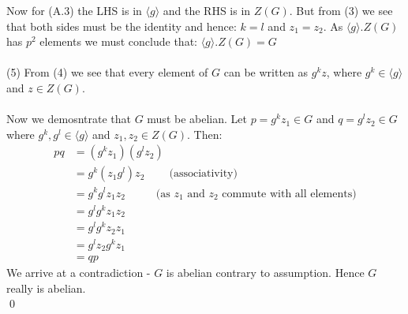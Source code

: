 \documentclass[12pt,a4paper]{article}
\begin{document}
Now for (A.3) the LHS is in $\langle g \rangle$ and the RHS is in $Z(G)$.  But from (3) we see that both sides must be the identity and hence:
$k=l$ and $z_1=z_2$.  As $\langle g \rangle . Z(G)$ has $p^2$ elements we must conclude that: $\langle g \rangle . Z(G) = G$ \\
\\
(5) From (4) we see that every element of $G$ can be written as $g^k z$, where $g^k \in \langle g \rangle$ and $z \in Z(G)$.\\
\\
Now we demosntrate that $G$ must be abelian.  Let $p = g^k z_1 \in G$ and $q = g^l z_2 \in G$ where $g^k, g^l \in \langle g \rangle$ and $z_1, z_2 \in Z(G)$.
Then:
\begin{align*}
    p q &= (g^k z_1)(g^l z_2) \\
    &= g^k (z_1 g^l) z_2 \;\;\;\;\;\;\;\; \text{(associativity)}\\
    &= g^k g^l z_1 z_2 \;\;\;\;\;\;\;\;\;\; \text{(as $z_1$ and $z_2$ commute with all elements)} \\
    &= g^l g^k z_1 z_2 \\
    &= g^l g^k z_2 z_1 \\
    &= g^l z_2 g^k z_1 \\
    &= q p
\end{align*}
We arrive at a contradiction - $G$ is abelian contrary to assumption.  Hence $G$ really is abelian.\\
\qed
\end{document}

